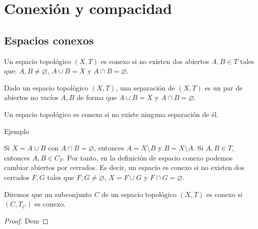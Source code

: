 \newpage
\section{Conexión y compacidad}

\subsection{Espacios conexos}
\begin{ndef}
  Un espacio topológico $(X,T)$ es conexo si no existen dos abiertos $A,B \in T$ tales que: $A,B \neq \varnothing$, $A \cup B = X$ y $A \cap B = \varnothing$.

\end{ndef}

\begin{ndef}[Separación]
    Dado un espacio topológico $(X,T)$, una separación de $(X,T)$ es un par de abiertos no vacíos $A,B$ de forma que $A \cup B = X$ y $A \cap B = \varnothing$.
\end{ndef}
\begin{obs}
    Un espacio topológico es conexo si no existe ninguna separación de él.
\end{obs}
\begin{exmp}
    Ejemplo
\end{exmp}

\begin{note}
    Si $X = A \cup B$ con $A \cap B = \varnothing$, entonces $A = X \setminus B$ y $B = X \setminus A$. Si $A,B \in T$, entonces $A,B \in C_T$. Por tanto, en la definición de espacio conexo podemos cambiar abiertos por cerrados. Es decir, un espacio es conexo si no existen dos cerrados $F,G$ tales que $F,G \neq \varnothing$, $X = F \cup G$ y $F \cap G = \varnothing$.
\end{note}

\begin{ndef}
    Diremos que un subconjunto $C$ de un espacio topológico $(X,T)$ es conexo si $(C,T_C)$ es conexo.
\end{ndef}
\begin{proof}
    Dem
\end{proof}


